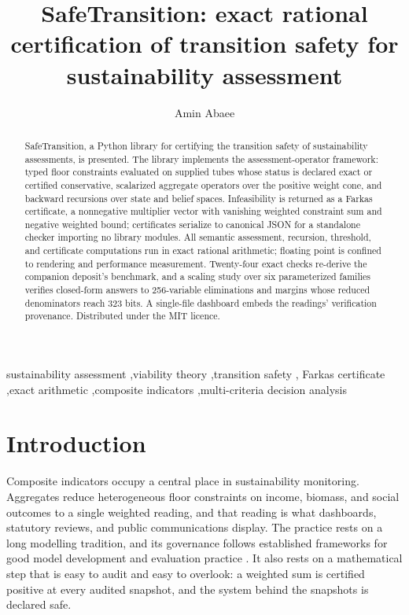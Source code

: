 \documentclass[3p,11pt]{elsarticle}
\begin{document}
\begin{frontmatter}

\title{SafeTransition: exact rational certification of transition safety for
sustainability assessment}

\author[aff]{Amin Abaee}
\address[aff]{Independent Researcher,
\href{https://orcid.org/0000-0002-0019-1842}{ORCID: 0000-0002-0019-1842},
\href{mailto:amin\_abaee@ut.ac.ir}{amin\_abaee@ut.ac.ir}}

\begin{abstract}
SafeTransition, a Python library for certifying the transition safety of
sustainability assessments, is presented. The library implements the
assessment-operator framework: typed floor constraints evaluated on
supplied tubes whose status is declared exact or certified conservative,
scalarized aggregate operators over the positive weight cone, and backward
recursions over state and belief spaces. Infeasibility is returned as a
Farkas certificate, a nonnegative multiplier vector with vanishing
weighted constraint sum and negative weighted bound; certificates
serialize to canonical JSON for a standalone checker importing no
library modules. All semantic assessment, recursion, threshold, and
certificate computations run in exact rational arithmetic; floating point
is confined to rendering and performance measurement. Twenty-four exact
checks re-derive the companion deposit's benchmark, and a scaling study
over six parameterized families verifies closed-form answers to
256-variable eliminations and margins whose reduced denominators reach
323 bits. A single-file dashboard embeds the readings' verification
provenance. Distributed under the MIT licence.
\end{abstract}

\begin{keyword}
sustainability assessment \sep viability theory \sep transition safety \sep
Farkas certificate \sep exact arithmetic \sep composite indicators
\sep multi-criteria decision analysis
\end{keyword}

\end{frontmatter}

\section{Introduction}\label{sec:introduction}

Composite indicators occupy a central place in sustainability monitoring.
Aggregates reduce heterogeneous floor constraints on income, biomass, and
social outcomes to a single weighted reading, and that reading is what
dashboards, statutory reviews, and public communications display. The
practice rests on a long modelling tradition, and its governance follows
established frameworks for good model development and evaluation practice
\citep{Jakeman2006}. It also rests on a mathematical step that
is easy to audit and easy to overlook: a weighted sum is certified positive
at every audited snapshot, and the system behind the snapshots is declared
safe.
\end{document}
